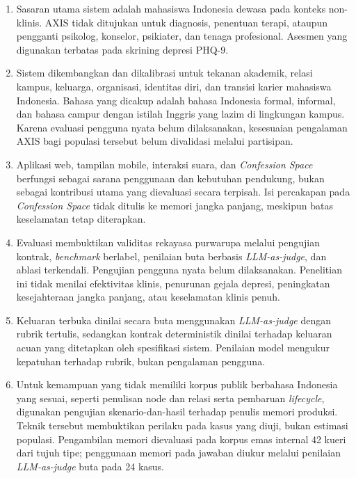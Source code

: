 \begin{enumerate}[label=\arabic*.,leftmargin=*,itemsep=4pt]
  \item Sasaran utama sistem adalah mahasiswa Indonesia dewasa pada konteks non-klinis. AXIS tidak ditujukan untuk diagnosis, penentuan terapi, ataupun pengganti psikolog, konselor, psikiater, dan tenaga profesional. Asesmen yang digunakan terbatas pada skrining depresi PHQ-9.

  \item Sistem dikembangkan dan dikalibrasi untuk tekanan akademik, relasi kampus, keluarga, organisasi, identitas diri, dan transisi karier mahasiswa Indonesia. Bahasa yang dicakup adalah bahasa Indonesia formal, informal, dan bahasa campur dengan istilah Inggris yang lazim di lingkungan kampus. Karena evaluasi pengguna nyata belum dilaksanakan, kesesuaian pengalaman AXIS bagi populasi tersebut belum divalidasi melalui partisipan.

  \item Aplikasi web, tampilan mobile, interaksi suara, dan \textit{Confession Space} berfungsi sebagai sarana penggunaan dan kebutuhan pendukung, bukan sebagai kontribusi utama yang dievaluasi secara terpisah. Isi percakapan pada \textit{Confession Space} tidak ditulis ke memori jangka panjang, meskipun batas keselamatan tetap diterapkan.

  \item Evaluasi membuktikan validitas rekayasa purwarupa melalui pengujian kontrak, \textit{benchmark} berlabel, penilaian buta berbasis \textit{LLM-as-judge}, dan ablasi terkendali. Pengujian pengguna nyata belum dilaksanakan. Penelitian ini tidak menilai efektivitas klinis, penurunan gejala depresi, peningkatan kesejahteraan jangka panjang, atau keselamatan klinis penuh.

  \item Keluaran terbuka dinilai secara buta menggunakan \textit{LLM-as-judge} dengan rubrik tertulis, sedangkan kontrak deterministik dinilai terhadap keluaran acuan yang ditetapkan oleh spesifikasi sistem. Penilaian model mengukur kepatuhan terhadap rubrik, bukan pengalaman pengguna.

  \item Untuk kemampuan yang tidak memiliki korpus publik berbahasa Indonesia yang sesuai, seperti penulisan node dan relasi serta pembaruan \textit{lifecycle}, digunakan pengujian skenario-dan-hasil terhadap penulis memori produksi. Teknik tersebut membuktikan perilaku pada kasus yang diuji, bukan estimasi populasi. Pengambilan memori dievaluasi pada korpus emas internal 42 kueri dari tujuh tipe; penggunaan memori pada jawaban diukur melalui penilaian \textit{LLM-as-judge} buta pada 24 kasus.


\end{enumerate}
